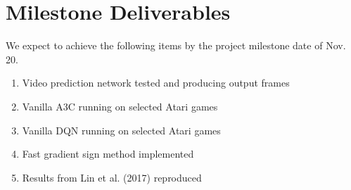 \section{Milestone Deliverables}

We expect to achieve the following items by the project milestone date of Nov. 20.

\begin{enumerate}
    \item Video prediction network tested and producing output frames
    \item Vanilla A3C running on selected Atari games
    \item Vanilla DQN running on selected Atari games
    \item Fast gradient sign method implemented
    \item Results from Lin et al. (2017) reproduced
\end{enumerate}
